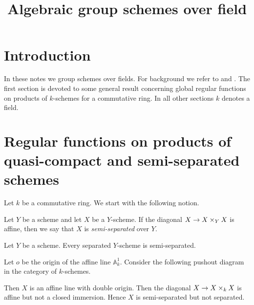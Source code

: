 



\title{Algebraic group schemes over field}
\date{}
\maketitle

\section{Introduction}
\noindent
In these notes we group schemes over fields. For background we refer to \cite{kfunctors} and \cite{Monoid_k_functors}. The first section is devoted to some general result concerning global regular functions on products of $k$-schemes for a commutative ring. In all other sections $k$ denotes a field.

\section{Regular functions on products of quasi-compact and semi-separated schemes}
\noindent
Let $k$ be a commutative ring. We start with the following notion.

\begin{definition}
Let $Y$ be a scheme and let $X$ be a $Y$-scheme. If the diagonal $X\rightarrow X\times_Y X$ is affine, then we say that $X$ is \textit{semi-separated} over $Y$.
\end{definition}

\begin{remark}\label{remark:separated_is_semi-separated}
Let $Y$ be a scheme. Every separated $Y$-scheme is semi-separated.
\end{remark}

\begin{example}
Let $o$ be the origin of the affine line $\mathbb{A}^1_k$. Consider the following pushout diagram in the category of $k$-schemes.
\begin{center}
\end{center}
Then $X$ is an affine line with double origin. Then the diagonal $X\rightarrow X\times_k X$ is affine but not a closed immersion. Hence $X$ is semi-separated but not separated.
\end{example}

